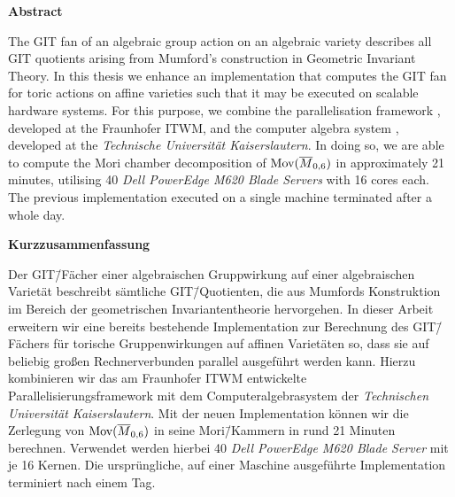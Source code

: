 \begin{center}
	\Large \textbf{Abstract}
\end{center}

The GIT fan of an algebraic group action on an algebraic variety describes all GIT quotients arising from Mumford's construction in Geometric Invariant Theory. In this thesis we enhance an implementation that computes the GIT fan for toric actions on affine varieties such that it may be executed on scalable hardware systems. For this purpose, we combine the parallelisation framework \gpispace{}, developed at the \acl{Fraunhofer ITWM}, and the computer algebra system \singular{}, developed at the \emph{Technische Universität Kaiserslautern}. In doing so, we are able to compute the Mori chamber decomposition of $\text{Mov}(\overline{M}_{0,6})$ in approximately 21 minutes, utilising 40 \emph{Dell PowerEdge M620 Blade Servers} with 16 cores each. The previous implementation executed on a single machine terminated after a whole day.


\begin{center}
\Large \textbf{Kurzzusammenfassung}
\end{center}

Der GIT\=/Fächer einer algebraischen Gruppwirkung auf einer algebraischen Varietät beschreibt sämtliche GIT\=/Quotienten, die aus Mumfords Konstruktion im Bereich der geometrischen Invariantentheorie hervorgehen. In dieser Arbeit erweitern wir eine bereits bestehende Implementation zur Berechnung des GIT\=/Fächers für torische Gruppenwirkungen auf affinen Varietäten so, dass sie auf beliebig großen Rechnerverbunden parallel ausgeführt werden kann. Hierzu kombinieren wir das am \acl{Fraunhofer ITWM} entwickelte Parallelisierungsframework \gpispace{} mit dem Computeralgebrasystem \singular{} der \emph{Technischen Universität Kaiserslautern}. Mit der neuen Implementation können wir die Zerlegung von $\text{Mov}(\overline{M}_{0,6})$ in seine Mori\=/Kammern in rund 21 Minuten berechnen. Verwendet werden hierbei 40 \emph{Dell PowerEdge M620 Blade Server} mit je 16 Kernen. Die ursprüngliche, auf einer Maschine ausgeführte Implementation terminiert nach einem Tag.